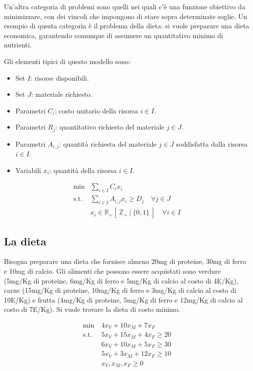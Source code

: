 Un'altra categoria di problemi sono quelli nei quali c'è una funzione obiettivo da minimizzare, con dei vincoli che impongono di stare sopra determinate soglie.
Un esempio di questa categoria è il problema della dieta: si vuole preparare una dieta economica, garantendo comunque di assumere un quantitativo minimo di nutrienti.

Gli elementi tipici di questo modello sono:

\begin{itemize}
	\item Set $I$: risorse disponibili.
	\item Set $J$: materiale richiesto.
	\item Parametri $C_i$: costo unitario della risorsa $i \in I$.
	\item Parametri $R_j$: quantitativo richiesto del materiale $j \in J$.
	\item Parametri $A_{i,j}$: quantità richiesta del materiale $j \in J$ soddisfatta dalla risorsa $i \in I$.
	\item Variabili $x_i$: quantità della risorsa $i \in I$.
\end{itemize}

\begin{align*}
	\min &\sum\limits_{i \in I} C_i x_i \\
	\text{s.t. }& \sum\limits_{i \in I} A_{i,j} x_i \geq D_j \quad\forall j \in J \\
	&x_i \in \mathbb{R}_+ [\:\mathbb{Z}_+ \:|\: \{0,1\}\:] \quad \forall i \in I
\end{align*}

\subsection{La dieta}

Bisogna preparare una dieta che fornisce almeno 20mg di proteine, 30mg di ferro e 10mg di calcio. Gli alimenti che possono essere acquistati sono verdure (5mg/Kg di proteine, 6mg/Kg di ferro e 5mg/Kg di calcio al costo di 4E/Kg), carne (15mg/Kg di proteine, 10mg/Kg di ferro e 3mg/Kg di calcio al costo di 10E/Kg) e frutta (4mg/Kg di proteine, 5mg/Kg di ferro e 12mg/Kg di calcio al costo di 7E/Kg). Si vuole trovare la dieta di costo minimo.

\begin{align*}
\min \: & 4x_V + 10 x_M + 7 x_F \\
\text{s.t. } & 5x_V + 15x_M + 4x_F \geq 20 \\
&6x_V + 10 x_M + 5 x_F \geq 30 \\
&5x_V + 3x_M +12x_F \geq 10 \\
&x_V, x_M, x_F \geq 0
\end{align*}

